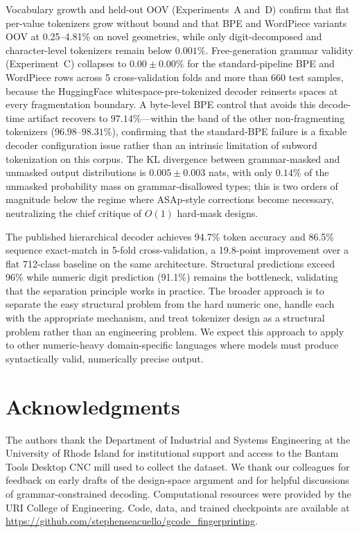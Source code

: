 \documentclass[11pt]{article}
\begin{document}
Vocabulary growth and held-out OOV (Experiments~A and~D) confirm that flat per-value tokenizers grow without bound and that BPE and WordPiece variants OOV at 0.25--4.81\% on novel geometries, while only digit-decomposed and character-level tokenizers remain below $0.001\%$. Free-generation grammar validity (Experiment~C) collapses to $0.00 \pm 0.00\%$ for the standard-pipeline BPE and WordPiece rows across 5 cross-validation folds and more than 660 test samples, because the HuggingFace whitespace-pre-tokenized decoder reinserts spaces at every fragmentation boundary. A byte-level BPE control that avoids this decode-time artifact recovers to $97.14\%$---within the band of the other non-fragmenting tokenizers ($96.98$--$98.31\%$), confirming that the standard-BPE failure is a fixable decoder configuration issue rather than an intrinsic limitation of subword tokenization on this corpus. The KL divergence between grammar-masked and unmasked output distributions is $0.005 \pm 0.003$ nats, with only $0.14\%$ of the unmasked probability mass on grammar-disallowed types; this is two orders of magnitude below the regime where ASAp-style corrections become necessary, neutralizing the chief critique of $O(1)$ hard-mask designs.

The published hierarchical decoder achieves 94.7\% token accuracy and 86.5\% sequence exact-match in 5-fold cross-validation, a 19.8-point improvement over a flat 712-class baseline on the same architecture. Structural predictions exceed 96\% while numeric digit prediction (91.1\%) remains the bottleneck, validating that the separation principle works in practice. The broader approach is to separate the easy structural problem from the hard numeric one, handle each with the appropriate mechanism, and treat tokenizer design as a structural problem rather than an engineering problem. We expect this approach to apply to other numeric-heavy domain-specific languages where models must produce syntactically valid, numerically precise output.

\section*{Acknowledgments}

The authors thank the Department of Industrial and Systems Engineering at the University of Rhode Island for institutional support and access to the Bantam Tools Desktop CNC mill used to collect the dataset. We thank our colleagues for feedback on early drafts of the design-space argument and for helpful discussions of grammar-constrained decoding. Computational resources were provided by the URI College of Engineering. Code, data, and trained checkpoints are available at \url{https://github.com/stephenseacuello/gcode\_fingerprinting}.
\end{document}
